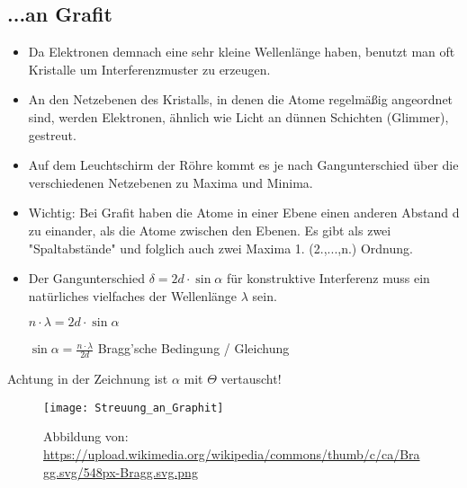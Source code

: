 \subsection{...an Grafit}
\begin{itemize}
\item Da Elektronen demnach eine sehr kleine Wellenlänge haben, benutzt man oft Kristalle um Interferenzmuster zu erzeugen.
\item An den Netzebenen des Kristalls, in denen die Atome regelmäßig angeordnet sind, werden Elektronen, ähnlich wie Licht an dünnen Schichten (Glimmer), gestreut.
\item Auf dem Leuchtschirm der Röhre kommt es je nach Gangunterschied über die verschiedenen Netzebenen zu Maxima und Minima.
\item Wichtig: Bei Grafit haben die Atome in einer Ebene einen anderen Abstand d zu einander, als die Atome zwischen den Ebenen. Es gibt als zwei "Spaltabstände" und folglich auch zwei Maxima 1. (2.,...,n.) Ordnung.

\item Der Gangunterschied $\delta = 2d\cdot\sin{\alpha} $ für konstruktive Interferenz muss ein natürliches vielfaches der Wellenlänge $\lambda$ sein.

$n \cdot \lambda = 2d \cdot \sin{\alpha}$

\Large $\sin{\alpha} = \frac{n \cdot \lambda}{2d}$ Bragg'sche Bedingung / Gleichung
\end{itemize}

Achtung in der Zeichnung ist $\alpha$ mit $\Theta$ vertauscht!

\begin{figure}[h!]
\centering \texttt{[image: Streuung\_an\_Graphit]}
\caption{Abbildung von: \url{https://upload.wikimedia.org/wikipedia/commons/thumb/c/ca/Bragg.svg/548px-Bragg.svg.png}}
\end{figure}



